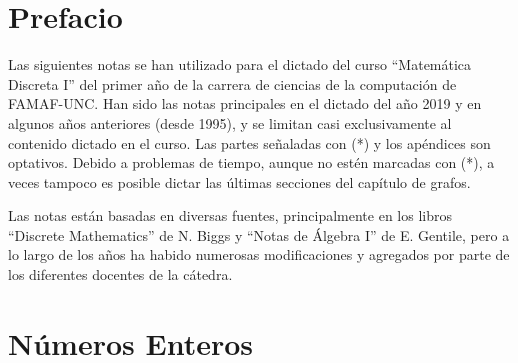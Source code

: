 \documentclass[11pt,spanish,makeidx]{amsbook}
\theoremstyle{definition}
\theoremstyle{remark}
\begin{document}
	\tableofcontents 


	\chapter*{Prefacio} 
	Las siguientes notas se han utilizado para el dictado del curso  “Matemática Discreta I” del primer año de la carrera de ciencias de la computación de FAMAF-UNC. Han sido las notas principales en el dictado del año 2019 y en algunos años anteriores (desde 1995), y se limitan casi exclusivamente al contenido dictado en el curso. Las partes señaladas con (*) y los apéndices son optativos. Debido a problemas de tiempo, aunque no estén marcadas con (*), a veces tampoco es posible dictar las últimas secciones del capítulo de grafos. 

	Las notas están basadas en diversas fuentes, principalmente en los libros “Discrete Mathematics” de N. Biggs y “Notas de Álgebra I” de E. Gentile, pero a lo largo de los años ha habido numerosas modificaciones y  agregados por parte de los diferentes docentes de la cátedra. 

\chapter[Números Enteros]{Números Enteros}
\end{document}
